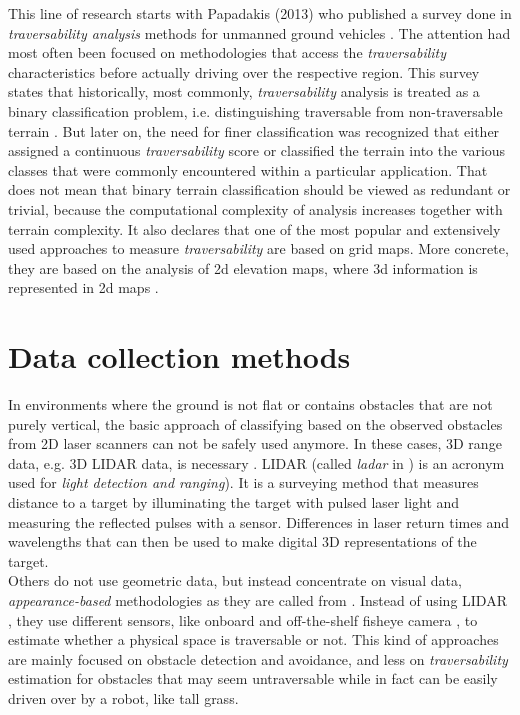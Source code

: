 \documentclass[12pt,a4paper]{report}
\newcommand{\term}{\textit}
\newcommand{\acronym}{\MakeUppercase}
\begin{document}
	This line of research starts with Papadakis (2013) who published a 
	survey done in \term{traversability analysis} methods for unmanned ground vehicles 
	\cite{Papadakis}. 
	The attention had most often been focused on methodologies that access the 
	\term{traversability} characteristics before actually driving over the respective 
	region.
	This survey states that historically, most commonly, \term{traversability} analysis is treated 
	as a binary classification problem, i.e. distinguishing traversable from 
	non-traversable terrain \cite{Suger, Hirose, Wigness}. 
	But later on, the need for finer classification was recognized that either assigned 
	a continuous \term{traversability} score or classified the terrain into the various classes 
	that were commonly encountered within a particular application.
	That does not mean that binary terrain classification should be viewed as redundant
	or trivial, because the computational complexity of analysis increases together 
	with terrain complexity.
	It also declares that one of the most popular and extensively used approaches 
	to measure \term{traversability} are based on grid 
	maps. More concrete, they are based on the analysis of 2d elevation maps, 
	where 3d information is represented in 2d maps \cite{Suger}.
	\\
	
	\section{Data collection methods}
	\label{sec:bg:data}
	
	In environments where the ground is not flat or contains obstacles that are 
	not purely vertical, the basic approach of classifying based on the observed 
	obstacles from \acronym{2d} laser scanners can not be safely used anymore. 
	In these cases, \acronym{3d} range data, e.g. \acronym{3d} \acronym{lidar} 
	data, is necessary \cite{Suger, Lalonde}. \acronym{lidar} (called \term{ladar} 
	in \cite{Lalonde}) is an acronym used for \term{light detection and ranging}). 
	It is a surveying method that measures distance to a target by illuminating 
	the target with pulsed laser light and measuring the reflected pulses with a 
	sensor. Differences in laser return times and wavelengths that can then be 
	used to make digital \acronym{3d} representations of the target.
	\\
	
	Others do not use geometric data, but instead concentrate on visual data, 
	\term{appearance-based} methodologies as they are called from \cite{Papadakis}. 
	Instead of using \acronym{lidar} \cite{Lalonde, Suger}, they use different 
	sensors, like onboard and off-the-shelf fisheye camera \cite{Hirose}, to 
	estimate whether a physical space is traversable or not. This kind of 
	approaches are mainly focused on obstacle detection and avoidance, and less 
	on \term{traversability} estimation for obstacles that may seem untraversable while 
	in fact can be easily driven over by a robot, like tall grass.
	\\
	
\end{document}
